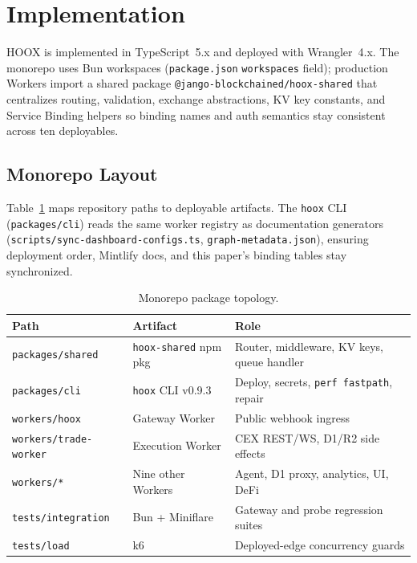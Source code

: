 \section{Implementation}
\label{sec:implementation}

\textsc{HOOX} is implemented in TypeScript~5.x and deployed with Wrangler~4.x. The monorepo uses Bun workspaces (\texttt{package.json} \texttt{workspaces} field); production Workers import a shared package \texttt{@jango-blockchained/hoox-shared} that centralizes routing, validation, exchange abstractions, KV key constants, and Service Binding helpers so binding names and auth semantics stay consistent across ten deployables.

\subsection{Monorepo Layout}

Table~\ref{tab:monorepo-layout} maps repository paths to deployable artifacts. The \texttt{hoox} CLI (\texttt{packages/cli}) reads the same worker registry as documentation generators (\texttt{scripts/sync-dashboard-configs.ts}, \texttt{graph-metadata.json}), ensuring deployment order, Mintlify docs, and this paper's binding tables stay synchronized.

\begin{table}[t]
  \centering
  \caption{Monorepo package topology.}
  \label{tab:monorepo-layout}
  \small
  \begin{tabular*}{\linewidth}{@{\extracolsep{\fill}}llp{6cm}@{}}
    \toprule
    \textbf{Path} & \textbf{Artifact} & \textbf{Role} \\
    \midrule
    \texttt{packages/shared} & \texttt{hoox-shared} npm pkg & Router, middleware, KV keys, queue handler \\
    \texttt{packages/cli} & \texttt{hoox} CLI v0.9.3 & Deploy, secrets, \texttt{perf fastpath}, repair \\
    \texttt{workers/hoox} & Gateway Worker & Public webhook ingress \\
    \texttt{workers/trade-worker} & Execution Worker & CEX REST/WS, D1/R2 side effects \\
    \texttt{workers/*} & Nine other Workers & Agent, D1 proxy, analytics, UI, DeFi \\
    \texttt{tests/integration} & Bun + Miniflare & Gateway and probe regression suites \\
    \texttt{tests/load} & k6 & Deployed-edge concurrency guards \\
    \bottomrule
  \end{tabular*}
\end{table}

